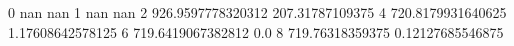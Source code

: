 0 nan nan
1 nan nan
2 926.9597778320312 207.31787109375
4 720.8179931640625 1.17608642578125
6 719.6419067382812 0.0
8 719.76318359375 0.12127685546875
